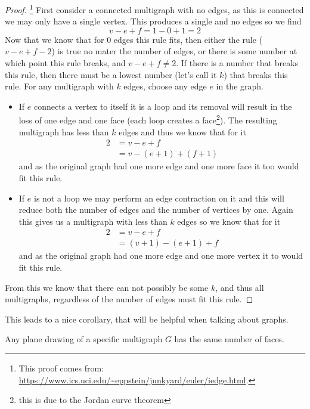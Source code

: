 \documentclass{article}
\begin{document}
\begin{proof}\footnote{This proof comes from: \url{https://www.ics.uci.edu/~eppstein/junkyard/euler/iedge.html}.}
	First consider a connected multigraph with no edges, as this is connected we may only have a single vertex. This produces a single and no edges so we find $$v-e+f=1-0+1=2$$ Now that we know that for 0 edges this rule fits, then either the rule ($v-e+f-2$) is true no mater the number of edges, or there is some number at which point this rule breaks, and $v-e+f\not=2$. If there is a number that breaks this rule, then there must be a lowest number (let's call it $k$) that breaks this rule. For any multigraph with $k$ edges, choose any edge $e$ in the graph.
	\begin{itemize}
		\item If $e$ connects a vertex to itself it is a loop and its removal will result in the loss of one edge and one face (each loop creates a face\footnote{this is due to the Jordan curve theorem}). The resulting multigraph has less than $k$ edges and thus we know that for it \begin{align*}2&=v-e+f \\&= v-(e+1)+(f+1)\end{align*} and as the original graph had one more edge and one more face it too would fit this rule.
		\item If $e$ is not a loop we may perform an edge contraction on it and this will reduce both the number of edges and the number of vertices by one. Again this gives us a multigraph with less than $k$ edges so we know that for it \begin{align*}2&=v-e+f\\&=(v+1)-(e+1)+f\end{align*} and as the original graph had one more edge and one more vertex it to would fit this rule.
	\end{itemize}
	
	From this we know that there can not possibly be some $k$, and thus all multigraphs, regardless of the number of edges must fit this rule.
\end{proof}
This leads to a nice corollary, that will be helpful when talking about graphs.
\begin{corallary}
	Any plane drawing of a specific multigraph $G$ has the same number of faces.
\end{corallary}
\end{document}
